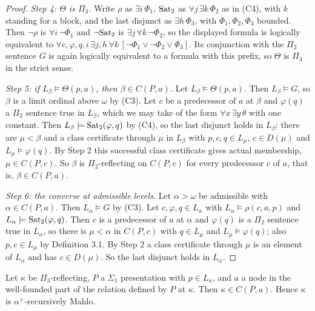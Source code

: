 \documentclass[11pt]{article}
\begin{document}
\begin{proof}
\emph{Step 4: $\Theta$ is $\Pi_3$.} Write $\rho$ as $\exists i\, \Phi_1$, $\mathrm{Sat}_2$ as
$\forall j\, \exists k\, \Phi_2$ as in (C4), with $k$ standing for a block, and the last disjunct as
$\exists h\, \Phi_3$, with $\Phi_1, \Phi_2, \Phi_3$ bounded. Then $\neg\rho$ is $\forall i\, \neg\Phi_1$ and
$\neg\mathrm{Sat}_2$ is $\exists j\, \forall k\, \neg\Phi_2$, so the displayed formula is logically equivalent to
$\forall c, \varphi, q, i\, \exists j, h\, \forall k\, [\neg \Phi_1 \vee \neg \Phi_2 \vee \Phi_3]$. Its conjunction
with the $\Pi_2$ sentence $G$ is again logically equivalent to a formula with this prefix, so $\Theta$ is $\Pi_3$ in
the strict sense.

\emph{Step 5: if $L_{\beta} \models \Theta(p, a)$, then $\beta \in C(P, a)$.} Let $L_{\beta} \models \Theta(p, a)$. Then
$L_{\beta} \models G$, so $\beta$ is a limit ordinal above $\omega$ by (C3). Let $c$ be a predecessor of $a$ at $\beta$
and $\varphi(q)$ a $\Pi_2$ sentence true in $L_{\beta}$, which we may take of the form $\forall x\, \exists y\, \theta$
with one constant. Then $L_{\beta} \models \mathrm{Sat}_2(\varphi, q)$ by (C4), so the last disjunct holds in $L_{\beta}$:
there are $\mu < \beta$ and a class certificate through $\mu$ in $L_{\beta}$ with $p, c, q \in L_{\mu}$,
$c \in D(\mu)$ and $L_{\mu} \models \varphi(q)$. By Step 2 this successful class certificate gives actual membership,
$\mu \in C(P, c)$. So $\beta$ is $\Pi_2$-reflecting on $C(P, c)$ for every predecessor $c$ of $a$, that is,
$\beta \in C(P, a)$.

\emph{Step 6: the converse at admissible levels.} Let $\alpha > \omega$ be admissible with $\alpha \in C(P, a)$. Then
$L_{\alpha} \models G$ by (C3). Let $c, \varphi, q \in L_{\alpha}$ with $L_{\alpha} \models \rho(c, a, p)$ and
$L_{\alpha} \models \mathrm{Sat}_2(\varphi, q)$. Then $c$ is a predecessor of $a$ at $\alpha$ and $\varphi(q)$ is a $\Pi_2$
sentence true in $L_{\alpha}$, so there is $\mu < \alpha$ in $C(P, c)$ with $q \in L_{\mu}$ and
$L_{\mu} \models \varphi(q)$; also $p, c \in L_{\mu}$ by Definition 3.1. By Step 2 a class certificate through $\mu$ is
an element of $L_{\alpha}$ and has $c \in D(\mu)$. So the last disjunct holds in $L_{\alpha}$.
\end{proof}

\begin{statement} Let $\kappa$ be $\Pi_3$-reflecting, $P$ a $\Sigma_1$ presentation with
$p \in L_{\kappa}$, and $a$ a node in the well-founded part of the relation defined by $P$ at $\kappa$. Then
$\kappa \in C(P, a)$. Hence $\kappa$ is $\alpha^+$-recursively Mahlo.
\end{statement}
\end{document}
